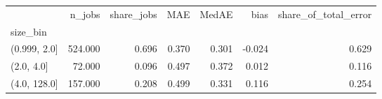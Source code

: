 \begin{tabular}{lrrrrrr}
\toprule
 & n_jobs & share_jobs & MAE & MedAE & bias & share_of_total_error \\
size_bin &  &  &  &  &  &  \\
\midrule
(0.999, 2.0] & 524.000 & 0.696 & 0.370 & 0.301 & -0.024 & 0.629 \\
(2.0, 4.0] & 72.000 & 0.096 & 0.497 & 0.372 & 0.012 & 0.116 \\
(4.0, 128.0] & 157.000 & 0.208 & 0.499 & 0.331 & 0.116 & 0.254 \\
\bottomrule
\end{tabular}
